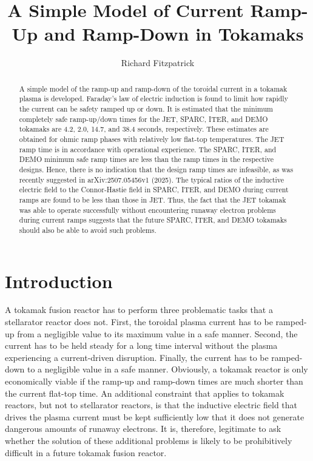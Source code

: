 \documentclass{iopjournal}
\begin{document}
\title{A Simple Model of Current Ramp-Up and Ramp-Down in Tokamaks}
\author{Richard Fitzpatrick}

\begin{abstract}
A simple model of the ramp-up and ramp-down of the toroidal current in a tokamak plasma is developed. Faraday's law of electric induction
is found to limit how rapidly the current can be safety ramped up or down. It is estimated that the minimum completely safe ramp-up/down times for the JET, SPARC,
ITER, and DEMO tokamaks are 4.2, 2.0, 14.7, and 38.4 seconds, respectively. These estimates are obtained for ohmic ramp phases with relatively low
flat-top temperatures. 
The JET ramp time is in accordance with operational experience. The SPARC, ITER, and DEMO minimum safe ramp times are less than the ramp times in the respective designs. Hence, there is no indication that the design ramp times are infeasible, as was recently 
suggested  in arXiv:2507.05456v1 (2025).
The typical ratios of the inductive electric field
to the Connor-Hastie field in SPARC, ITER, and DEMO during current ramps are found to be less than those in JET. Thus, the fact that the JET tokamak was able to operate successfully
without encountering runaway electron problems during current ramps suggests that the future SPARC, ITER, and DEMO tokamaks should also be able to
avoid such problems. 
\end{abstract}

\section{Introduction}\label{s1}
A tokamak fusion reactor has to perform three problematic tasks that a stellarator reactor does not. First, the toroidal plasma current has to be ramped-up from a negligible value to its maximum value in a safe manner. Second, the current
has to be held steady for a long time interval without the plasma experiencing a current-driven disruption. Finally, the current has to be ramped-down to a negligible value in a safe manner.
Obviously, a tokamak reactor is only economically viable if the ramp-up and ramp-down times are much shorter than the current flat-top time. 
An additional constraint that applies to tokamak reactors, but not to stellarator reactors,  is that the inductive electric field that drives the plasma current must be kept sufficiently
low that it does not generate dangerous amounts of 
runaway electrons. It is, therefore, legitimate to ask whether the solution of these  additional problems is likely to be prohibitively difficult in a future tokamak fusion reactor.
\end{document}
